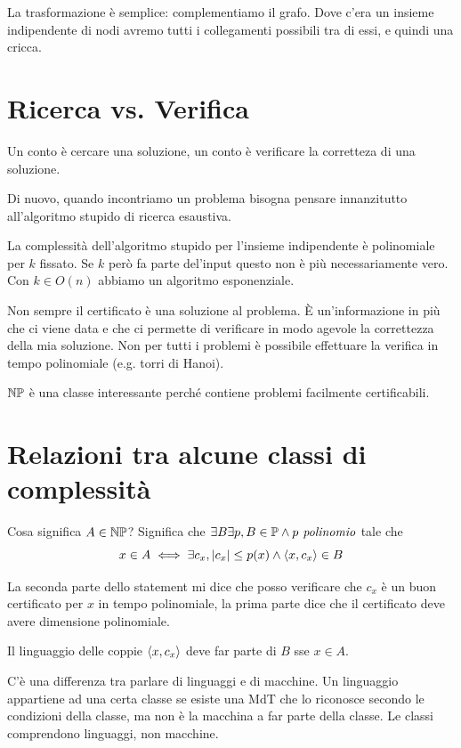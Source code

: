 La trasformazione è semplice: complementiamo il grafo. Dove c'era un insieme indipendente di nodi
avremo tutti i collegamenti possibili tra di essi, e quindi una cricca.

\section{Ricerca vs. Verifica}


Un conto è cercare una soluzione, un conto è verificare la corretteza di una soluzione.

Di nuovo, quando incontriamo un problema bisogna pensare innanzitutto all'algoritmo stupido di
ricerca esaustiva.

La complessità dell'algoritmo stupido per l'insieme indipendente è polinomiale per $k$ fissato. Se $k$
però fa parte del'input questo non è più necessariamente vero. Con $k \in O(n)$ abbiamo un
algoritmo esponenziale.

Non sempre il certificato è una soluzione al problema. È un'informazione in più che ci viene data
e che ci permette di verificare in modo agevole la correttezza della mia soluzione. Non per tutti i
problemi è possibile effettuare la verifica in tempo polinomiale (e.g. torri di Hanoi).

$\mathbb{NP}$ è una classe interessante perché contiene problemi facilmente certificabili.

\section{Relazioni tra alcune classi di complessità}

Cosa significa $A \in \mathbb{NP}$? Significa che $\exists B \exists p, B \in \mathbb{P} \land p\textit{ polinomio}$
tale che
\begin{equation*}
    x \in A \iff \exists c_{x}, |c_{x}| \leq p(x) \land \langle x, c_{x} \rangle \in B
\end{equation*}

La seconda parte dello statement mi dice che posso verificare che $c_{x}$ è un buon certificato per
$x$ in tempo polinomiale, la prima parte dice che il certificato deve avere dimensione polinomiale.

Il linguaggio delle coppie $\langle x, c_{x} \rangle$ deve far parte di $B$ sse $x \in A$. 

C'è una differenza tra parlare di linguaggi e di macchine. Un linguaggio appartiene ad una certa
classe se esiste una MdT che lo riconosce secondo le condizioni della classe, ma non è la macchina
a far parte della classe. Le classi comprendono linguaggi, non macchine.

